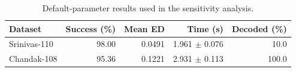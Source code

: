 \begin{table}[t]
\centering
\caption{Default-parameter results used in the sensitivity analysis.}
\label{tab:sensitivity-default}
\small
\begin{tabular}{lrrrr}
\hline
Dataset & Success (\%) & Mean ED & Time (s) & Decoded (\%) \\
\hline
Srinivas-110 & 98.00 & 0.0491 & 1.961 $\pm$ 0.076 & 10.0 \\
Chandak-108 & 95.36 & 0.1221 & 2.931 $\pm$ 0.113 & 100.0 \\
\hline
\end{tabular}
\end{table}
